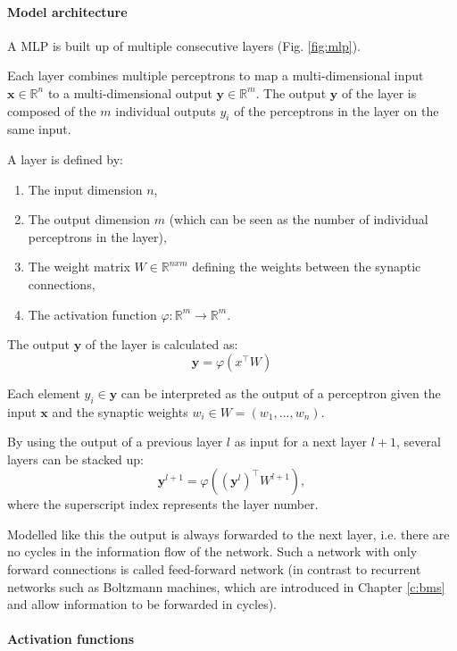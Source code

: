 \paragraph{Model architecture} \label{c:mlparch}

A MLP is built up of multiple consecutive layers (Fig. \ref{fig:mlp}).

Each layer combines multiple perceptrons to map a multi-dimensional input $\textbf{x} \in \mathbb{R}^n$ to a multi-dimensional output $\textbf{y} \in \mathbb{R}^m$.
The output $\textbf{y}$ of the layer is composed of the $m$ individual outputs $y_i$ of the perceptrons in the layer on the same input.


A layer is defined by:
\begin{enumerate}
	\item The input dimension $n$,
	\item The output dimension $m$ (which can be seen as the number of individual perceptrons in the layer),
	\item The weight matrix $W \in \mathbb{R}^{nxm} $ defining the weights between the synaptic connections,
	\item The activation function $\varphi : \mathbb{R}^m \rightarrow \mathbb{R}^m $.
\end{enumerate}

The output $\textbf{y}$ of the layer is calculated as:
\[
\textbf{y} = \varphi(x^\intercal W)
\]

Each element $y_i \in \textbf{y}$ can be interpreted as the output of a perceptron given the input $\textbf{x}$ and the synaptic weights $w_i \in W = (w_1, ... , w_n)$.

By using the output of a previous layer $l$ as input for a next layer $l+1$, several layers can be stacked up: 
\[
\textbf{y}^{l+1} = \varphi ((\textbf{y}^{l})^\intercal W^{l+1} ) ,
\]
where the superscript index represents the layer number. 

Modelled like this the output is always forwarded to the next layer, i.e. there are no cycles in the information flow of the network.
Such a network with only forward connections is called feed-forward network (in contrast to recurrent networks such as Boltzmann machines, which are introduced in Chapter \ref{c:bms} and allow information to be forwarded in cycles).


\paragraph{Activation functions} \label{c:mlpact}


